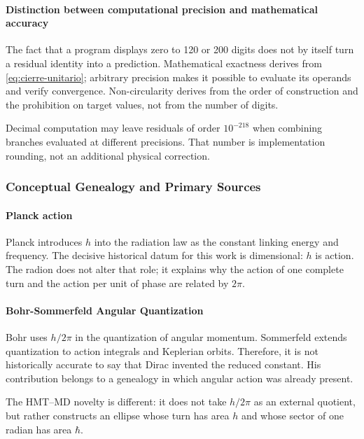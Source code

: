 \paragraph{Distinction between computational precision and mathematical accuracy}

The fact that a program displays zero to 120 or 200 digits does not by itself turn a residual identity into a prediction. Mathematical exactness derives from \eqref{eq:cierre-unitario}; arbitrary precision makes it possible to evaluate its operands and verify convergence. Non-circularity derives from the order of construction and the prohibition on target values, not from the number of digits.

Decimal computation may leave residuals of order \(10^{-218}\) when combining
branches evaluated at different precisions. That number is implementation
rounding, not an additional physical correction.
\subsubsection{Conceptual Genealogy and Primary Sources}

\paragraph{Planck action}

Planck introduces \(h\) into the radiation law as the constant linking energy
and frequency. The decisive historical datum for this work is dimensional:
\(h\) is action. The radion does not alter that role; it explains why the action of
one complete turn and the action per unit of phase are related by \(2\pi\).

\paragraph{Bohr-Sommerfeld Angular Quantization}

Bohr uses \(h/2\pi\) in the quantization of angular momentum. Sommerfeld extends
quantization to action integrals and Keplerian orbits. Therefore, it is not
historically accurate to say that Dirac invented the reduced constant. His
contribution belongs to a genealogy in which angular action was already
present.

The HMT--MD novelty is different: it does not take \(h/2\pi\) as an external quotient,
but rather constructs an ellipse whose turn has area \(h\) and whose sector of one
radian has area \(\hbar\).

